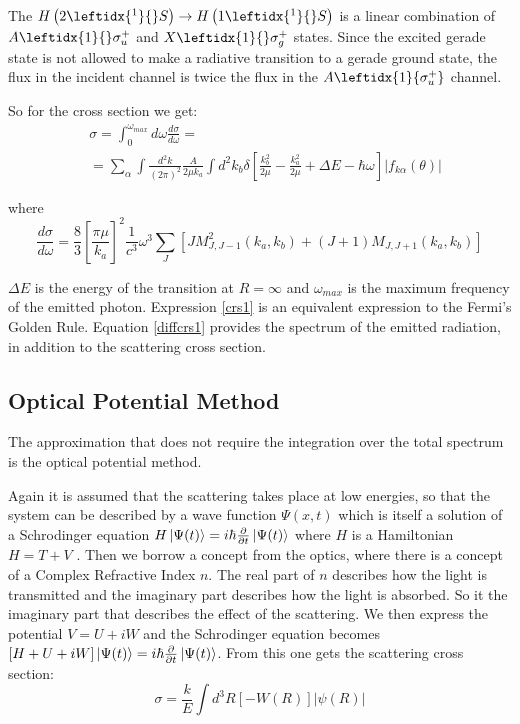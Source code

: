 The $ H\left(2 \leftidx{^1}{}S\right) \rightarrow H\left(1 \leftidx{^1}{}S\right) $ is a linear combination of $ A \leftidx{1}{}\sigma_u^{+} $ and $ X \leftidx{1}{}\sigma_g^{+} $ states. Since the excited gerade state is not allowed to make a radiative transition to a gerade ground state, the flux in the incident channel is twice the flux in the $ A \leftidx{1}{\sigma_u^{+}} $ channel.

So for the cross section we get:
\begin{equation}\label{crs1}
\begin{split}
& \sigma = \int_0^{\omega_{max}}{d\omega\frac{d\sigma}{d\omega}} = \\[.8em]
& = \sum_{\alpha}{\int{\frac{d^2k}{(2\pi)^2}\frac{A}{2\mu k_a}\int{d^2k_b\delta\left[\frac{k_b^2}{2\mu} - \frac{k_a^2}{2\mu} + \Delta E - \hbar\omega \right]\left|f_{k\alpha}(\theta) \right| } } }
\end{split}
\end{equation}

where
\begin{equation}\label{diffcrs1}
\frac{d\sigma}{d\omega} = \frac{8}{3}\left[\frac{\pi \mu}{k_a}\right]^2 \frac{1}{c^3}\omega^3 \sum_{J}{\left[J M_{J,J-1}^2(k_a,k_b) + (J+1)M_{J,J+1}(k_a,k_b)\right] }
\end{equation}

$ \Delta E $ is the energy of the transition at $ R = \infty $ and $ \omega_{max} $ is the maximum frequency of the emitted photon. Expression \eqref{crs1} is an equivalent expression to the Fermi's Golden Rule. Equation \eqref{diffcrs1} provides the spectrum of the emitted radiation, in addition to the scattering cross section. 

\subsection{Optical Potential Method}

The approximation that does not require the integration over the total spectrum is the optical potential method. 

Again it is assumed that the scattering takes place at low energies, so that the system can be described by a wave function $ \Psi(x,t) $ which is itself a solution of a Schrodinger equation $ H\ket{\Psi(t)} = i\hbar\frac{\partial}{\partial t}\ket{\Psi(t)} $ where $ H $ is a Hamiltonian $ H = T + V $ .
Then we borrow a concept from the optics, where there is a concept of a Complex Refractive Index $ n $. The real part of $ n $ describes how the light is transmitted and the imaginary part describes how the light is absorbed. So it the imaginary part that describes the effect of the scattering. We then express the potential $ V = U + iW $  and the Schrodinger equation becomes $ \left[H + U + iW\right]\ket{\Psi(t)} = i\hbar\frac{\partial}{\partial t}\ket{\Psi(t)} $. From this one gets the scattering cross section:
\begin{equation}
\sigma = \frac{k}{E}\int{d^3R\left[-W(R)\right]\left| \psi(R) \right|}
\end{equation}

